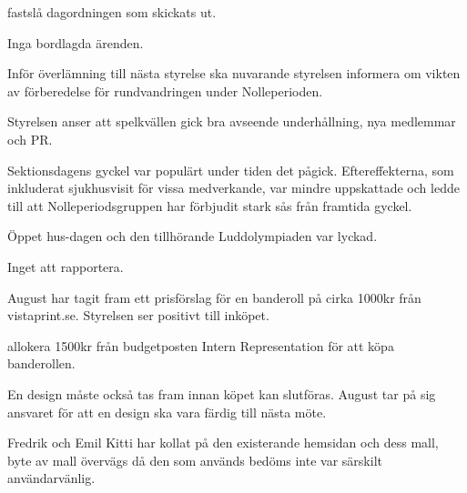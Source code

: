 \documentclass{protokoll}
\begin{document}
\newpage  


\begin{beslut}
     \att fastslå dagordningen som skickats ut.
\end{beslut}

Inga bordlagda ärenden.

Inför överlämning till nästa styrelse ska nuvarande styrelsen informera om vikten av förberedelse för rundvandringen under Nolleperioden. 

Styrelsen anser att spelkvällen gick bra avseende underhållning, nya medlemmar och PR.

Sektionsdagens gyckel var populärt under tiden det pågick. Eftereffekterna, som inkluderat sjukhusvisit för vissa medverkande, var mindre uppskattade och ledde till att Nolleperiodsgruppen har förbjudit stark sås från framtida gyckel. 

Öppet hus-dagen och den tillhörande Luddolympiaden var lyckad. 


Inget att rapportera.

August har tagit fram ett prisförslag för en banderoll på cirka 1000kr från vistaprint.se. Styrelsen ser positivt till inköpet.
\begin{beslut}
    \att allokera 1500kr från budgetposten Intern Representation för att köpa banderollen.
\end{beslut}
En design måste också tas fram innan köpet kan slutföras. August tar på sig ansvaret för att en design ska vara färdig till nästa möte.

Fredrik och Emil Kitti har kollat på den existerande hemsidan och dess mall, byte av mall övervägs då den som används bedöms inte var särskilt användarvänlig.
\end{document}
